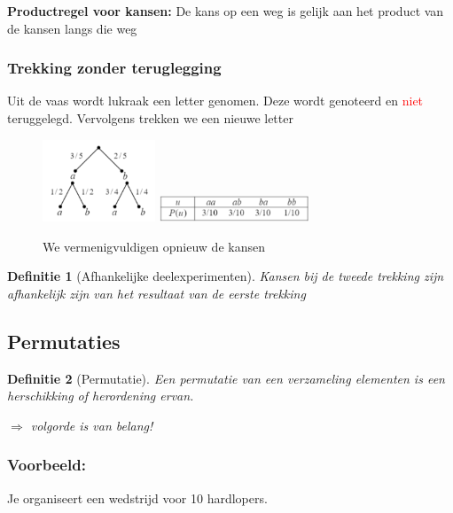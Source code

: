 \documentclass{article}
\newtheorem{theorem}{Definitie}[section]
\begin{document}
\textbf{Productregel voor kansen:} De kans op een weg is gelijk aan het product van de kansen langs die weg
    

\subsubsection{Trekking zonder teruglegging}

Uit de vaas wordt lukraak een letter genomen. Deze wordt genoteerd en \textcolor{red}{niet} teruggelegd.
Vervolgens trekken we een nieuwe letter

\begin{figure}[H]
    \centering
    \includegraphics[width=0.3\textwidth]{trekking-zonder-teruglegging-kansboom.png}
    \includegraphics[width=0.4\textwidth]{trekking-zonder-teruglegging-tabel.png}
    \caption{We vermenigvuldigen opnieuw de kansen}
\end{figure}


\begin{theorem}[Afhankelijke deelexperimenten]
    Kansen bij de tweede trekking zijn afhankelijk zijn van het resultaat van de eerste trekking
\end{theorem}

\subsection{Permutaties}

\begin{theorem}[Permutatie]
    Een permutatie van een verzameling elementen is een herschikking of herordening ervan.

    $\Rightarrow$ volgorde is van belang! 
\end{theorem}

\subsubsection{Voorbeeld:} 

Je organiseert een wedstrijd voor 10 hardlopers. 
\end{document}
